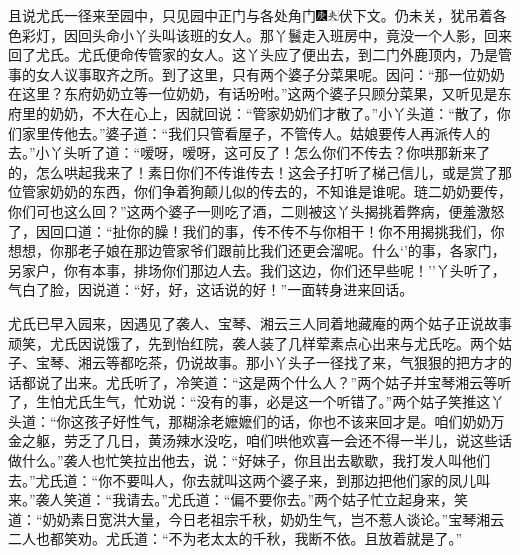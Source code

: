 且说尤氏一径来至园中，只见园中正门与各处角门{\includegraphics[width=3mm]{../Images/00004}\includegraphics[width=3mm]{../Images/00012}\footnotesize \kaishu 伏下文。}仍未关，犹吊着各色彩灯，因回头命小丫头叫该班的女人。那丫鬟走入班房中，竟没一个人影，回来回了尤氏。尤氏便命传管家的女人。这丫头应了便出去，到二门外鹿顶内，乃是管事的女人议事取齐之所。到了这里，只有两个婆子分菜果呢。因问：``那一位奶奶在这里？东府奶奶立等一位奶奶，有话吩咐。''这两个婆子只顾分菜果，又听见是东府里的奶奶，不大在心上，因就回说：``管家奶奶们才散了。''小丫头道：``散了，你们家里传他去。''婆子道：``我们只管看屋子，不管传人。姑娘要传人再派传人的去。''小丫头听了道：``嗳呀，嗳呀，这可反了！怎么你们不传去？你哄那新来了的，怎么哄起我来了！素日你们不传谁传去！这会子打听了梯己信儿，或是赏了那位管家奶奶的东西，你们争着狗颠儿似的传去的，不知谁是谁呢。琏二奶奶要传，你们可也这么回？''这两个婆子一则吃了酒，二则被这丫头揭挑着弊病，便羞激怒了，因回口道：``扯你的臊！我们的事，传不传不与你相干！你不用揭挑我们，你想想，你那老子娘在那边管家爷们跟前比我们还更会溜呢。什么`'的事，各家门，另家户，你有本事，排场你们那边人去。我们这边，你们还早些呢！''丫头听了，气白了脸，因说道：``好，好，这话说的好！''一面转身进来回话。

尤氏已早入园来，因遇见了袭人、宝琴、湘云三人同着地藏庵的两个姑子正说故事顽笑，尤氏因说饿了，先到怡红院，袭人装了几样荤素点心出来与尤氏吃。两个姑子、宝琴、湘云等都吃茶，仍说故事。那小丫头子一径找了来，气狠狠的把方才的话都说了出来。尤氏听了，冷笑道：``这是两个什么人？''两个姑子并宝琴湘云等听了，生怕尤氏生气，忙劝说：``没有的事，必是这一个听错了。''两个姑子笑推这丫头道：``你这孩子好性气，那糊涂老嬷嬷们的话，你也不该来回才是。咱们奶奶万金之躯，劳乏了几日，黄汤辣水没吃，咱们哄他欢喜一会还不得一半儿，说这些话做什么。''袭人也忙笑拉出他去，说：``好妹子，你且出去歇歇，我打发人叫他们去。''尤氏道：``你不要叫人，你去就叫这两个婆子来，到那边把他们家的凤儿叫来。''袭人笑道：``我请去。''尤氏道：``偏不要你去。''两个姑子忙立起身来，笑道：``奶奶素日宽洪大量，今日老祖宗千秋，奶奶生气，岂不惹人谈论。''宝琴湘云二人也都笑劝。尤氏道：``不为老太太的千秋，我断不依。且放着就是了。''

